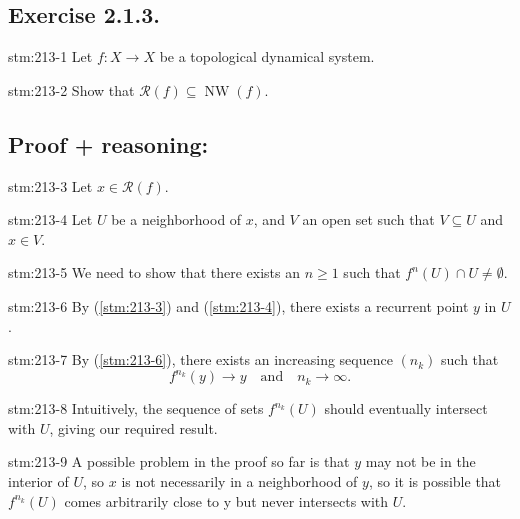 \subsection*{Exercise 2.1.3.}

\begin{exercise}{stm:213-1}
Let $f : X \to X$ be a topological dynamical system.
\end{exercise}

\begin{exercise}{stm:213-2}
Show that $\mathcal{R}(f) \subseteq \operatorname{NW}(f)$.
\end{exercise}

\subsection*{Proof {\color{blue}+ reasoning}:}

\begin{statement}{stm:213-3}
Let $x \in \mathcal{R}(f)$. 
\end{statement}

\begin{statement}{stm:213-4}
Let $U$ be a neighborhood of $x$, and $V$ an open set such that $V \subseteq U$ and $x \in V$.
\end{statement}

\begin{explanation}{stm:213-5}
We need to show that there exists an $n \geq 1$ such that $f^n(U) \cap U \neq \emptyset$.
\end{explanation}

\begin{explanation}{stm:213-6}
By (\ref{stm:213-3}) and (\ref{stm:213-4}), there exists a recurrent point $y$ in $U$.
\end{explanation}

\begin{explanation}{stm:213-7}
By (\ref{stm:213-6}), there exists an increasing sequence $(n_k)$ such that 
\[
f^{n_k}(y) \to y \quad \text{and} \quad n_k \to \infty.
\]
\end{explanation}

\begin{explanation}{stm:213-8}
Intuitively, the sequence of sets $f^{n_k}(U)$ should eventually intersect with $U$, giving our required result.
\end{explanation}

\begin{explanation}{stm:213-9}
A possible problem in the proof so far is that $y$ may not be in the interior of $U$, so $x$ is not necessarily in a neighborhood of $y$, so it is possible that $f^{n_k}(U)$ comes arbitrarily close to y but never intersects with $U$.
\end{explanation}

